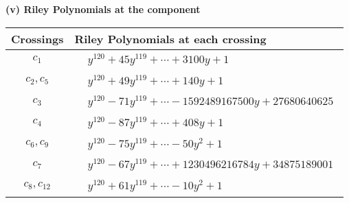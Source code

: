 \documentclass[1p]{elsarticle_modified}
\theoremstyle{definition}
\begin{document}
\newpage\renewcommand{\arraystretch}{1}
\flushleft \textbf{(v) Riley Polynomials at the component}\newline \\
\begin{tabular}{m{50pt}|m{274pt}}
Crossings & \hspace{64pt}Riley Polynomials at each crossing \\
\hline $$\begin{aligned}c_{1}\end{aligned}$$&$\begin{aligned}
&y^{120}+45 y^{119}+\cdots+3100 y+1
\end{aligned}$\\
\hline $$\begin{aligned}c_{2},c_{5}\end{aligned}$$&$\begin{aligned}
&y^{120}+49 y^{119}+\cdots+140 y+1
\end{aligned}$\\
\hline $$\begin{aligned}c_{3}\end{aligned}$$&$\begin{aligned}
&y^{120}-71 y^{119}+\cdots-1592489167500 y+27680640625
\end{aligned}$\\
\hline $$\begin{aligned}c_{4}\end{aligned}$$&$\begin{aligned}
&y^{120}-87 y^{119}+\cdots+408 y+1
\end{aligned}$\\
\hline $$\begin{aligned}c_{6},c_{9}\end{aligned}$$&$\begin{aligned}
&y^{120}-75 y^{119}+\cdots-50 y^2+1
\end{aligned}$\\
\hline $$\begin{aligned}c_{7}\end{aligned}$$&$\begin{aligned}
&y^{120}-67 y^{119}+\cdots+1230496216784 y+34875189001
\end{aligned}$\\
\hline $$\begin{aligned}c_{8},c_{12}\end{aligned}$$&$\begin{aligned}
&y^{120}+61 y^{119}+\cdots-10 y^2+1
\end{aligned}$\\

\end{tabular}
\end{document}
